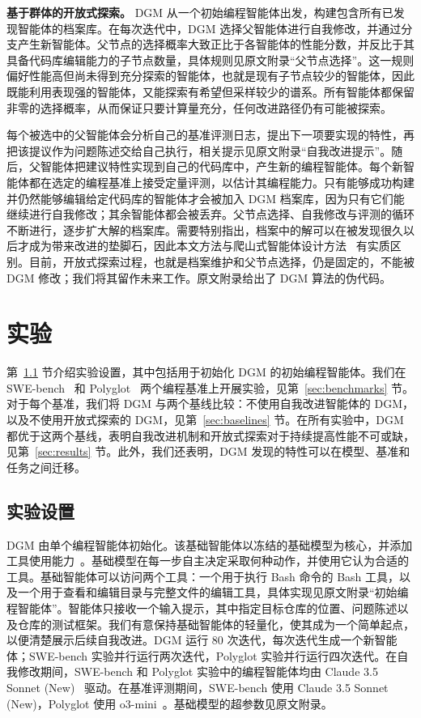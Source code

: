 \documentclass[10pt,twocolumn]{article}
\begin{document}
\textbf{基于群体的开放式探索。}
DGM 从一个初始编程智能体出发，构建包含所有已发现智能体的档案库。在每次迭代中，DGM 选择父智能体进行自我修改，并通过分支产生新智能体。父节点的选择概率大致正比于各智能体的性能分数，并反比于其具备代码库编辑能力的子节点数量，具体规则见原文附录“父节点选择”。这一规则偏好性能高但尚未得到充分探索的智能体，也就是现有子节点较少的智能体，因此既能利用表现强的智能体，又能探索有希望但采样较少的谱系。所有智能体都保留非零的选择概率，从而保证只要计算量充分，任何改进路径仍有可能被探索。

每个被选中的父智能体会分析自己的基准评测日志，提出下一项要实现的特性，再把该提议作为问题陈述交给自己执行，相关提示见原文附录“自我改进提示”。随后，父智能体把建议特性实现到自己的代码库中，产生新的编程智能体。每个新智能体都在选定的编程基准上接受定量评测，以估计其编程能力。只有能够成功构建并仍然能够编辑给定代码库的智能体才会被加入 DGM 档案库，因为只有它们能继续进行自我修改；其余智能体都会被丢弃。父节点选择、自我修改与评测的循环不断进行，逐步扩大解的档案库。需要特别指出，档案中的解可以在被发现很久以后才成为带来改进的垫脚石，因此本文方法与爬山式智能体设计方法~\citep{robeyns2025self} 有实质区别。目前，开放式探索过程，也就是档案维护和父节点选择，仍是固定的，不能被 DGM 修改；我们将其留作未来工作。原文附录给出了 DGM 算法的伪代码。

\section{实验}
\label{sec:experiments}

第~\ref{sec:experiment-setup} 节介绍实验设置，其中包括用于初始化 DGM 的初始编程智能体。我们在 SWE-bench~\citep{jimenez2024swebench} 和 Polyglot~\citep{gauthier2024polyglot} 两个编程基准上开展实验，见第~\ref{sec:benchmarks} 节。对于每个基准，我们将 DGM 与两个基线比较：不使用自我改进智能体的 DGM，以及不使用开放式探索的 DGM，见第~\ref{sec:baselines} 节。在所有实验中，DGM 都优于这两个基线，表明自我改进机制和开放式探索对于持续提高性能不可或缺，见第~\ref{sec:results} 节。此外，我们还表明，DGM 发现的特性可以在模型、基准和任务之间迁移。

\subsection{实验设置}
\label{sec:experiment-setup}

DGM 由单个编程智能体初始化。该基础智能体以冻结的基础模型为核心，并添加工具使用能力~\citep{schick2023toolformer,anthropic_tool_use_2024}。基础模型在每一步自主决定采取何种动作，并使用它认为合适的工具。基础智能体可以访问两个工具：一个用于执行 Bash 命令的 Bash 工具，以及一个用于查看和编辑目录与完整文件的编辑工具，具体实现见原文附录“初始编程智能体”。智能体只接收一个输入提示，其中指定目标仓库的位置、问题陈述以及仓库的测试框架。我们有意保持基础智能体的轻量化，使其成为一个简单起点，以便清楚展示后续自我改进。DGM 运行 80 次迭代，每次迭代生成一个新智能体；SWE-bench 实验并行运行两次迭代，Polyglot 实验并行运行四次迭代。在自我修改期间，SWE-bench 和 Polyglot 实验中的编程智能体均由 Claude 3.5 Sonnet (New)~\citep{anthropic2024claude35sonnet} 驱动。在基准评测期间，SWE-bench 使用 Claude 3.5 Sonnet (New)，Polyglot 使用 o3-mini~\citep{openai2025o3mini}。基础模型的超参数见原文附录。
\end{document}
